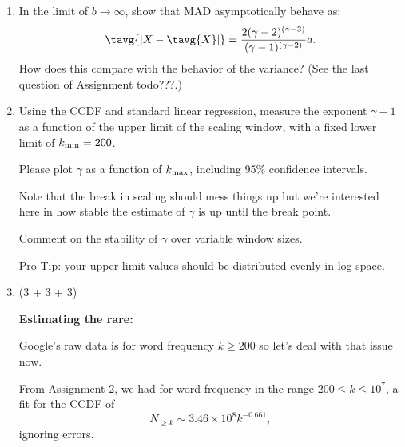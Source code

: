 \begin{enumerate}

   \solutionend

\item

  In the limit of $b \rightarrow \infty$,
  show that MAD asymptotically behave as:
  $$
  \tavg{|X - \tavg{X}|}
  =
  \frac{2(\gamma-2)^{(\gamma-3)}}
  {(\gamma-1)^{(\gamma-2)}
  }
  a.
  $$
  How does this compare with the behavior of the variance?
  (See the last question of Assignment todo{???}.)

  
   \solutionstart


   \solutionend





\item 
  Using the CCDF and standard linear regression, 
  measure the exponent $\gamma-1$ as a function
  of the upper limit of the scaling window, with
  a fixed lower limit of $k_{\rm min}=200$.

  Please plot $\gamma$ as a function of $k_{\rm max}$,
  including 95\% confidence intervals.

  Note that the break in scaling should mess things up
  but we're interested here in how stable
  the estimate of $\gamma$ is up until the break point.

  Comment on the stability of $\gamma$ over
  variable window sizes.

  Pro Tip: your upper limit values should be distributed
  evenly in log space.

  
   \solutionstart


   \solutionend




\item (3 + 3 + 3)

  \textbf{Estimating the rare:}

  Google's raw data is for word frequency $k \ge 200$ so
  let's deal with that issue now.

  From Assignment 2,
  we had for word frequency in the range $200 \le k \le 10^{7}$,
  a fit for the CCDF of
  $$
  N_{\ge k} \sim 3.46 \times 10^{8} k^{-0.661},
  $$
  ignoring errors.


\end{enumerate}
